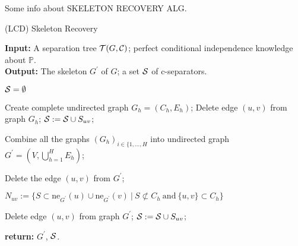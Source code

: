 %
%


Some info about SKELETON RECOVERY ALG.

\begin{algorithm}
	\caption{(LCD) Skeleton Recovery}\label{skeletonRecoveryAlg}
	
	\textbf{Input:} A separation tree $ \mathcal{T}(G, \mathcal{C})$; 
					perfect conditional independence knowledge about $\mathbb{P}$.  \\
	\textbf{Output:} The skeleton $G^{'}$ of $G$; a set $\mathcal{S}$ of c-separators.

	
	\begin{algorithmic}[1]
			\State $\mathcal{S} = \emptyset$
	
				\State	Create complete undirected graph $G_h = (C_h, E_h)$;
						\State Delete edge $(u, v)$ from graph $G_h$;
						\State $\mathcal{S} := \mathcal{S} \cup S_{uv}$; 
					\EndIf
				\EndFor
			\EndFor			
		
			\State Combine all the graphs $(G_h)_{i \in \{1, \dots, H}$ into undirected graph 
			$G^{'} = (V, \bigcup_{h = 1}^{H} E_h)$;
			
					\State Delete the edge $(u, v)$ from $G^{'}$;
				\EndIf
			\EndFor
			
					
				\State $N_{uv} := \{S \subset \mbox{ne}_{G^{'}}(u) \cup \mbox{ne}_{G^{'}}(v) \ | \ 
									S \not\subset C_h \ \mbox{and} \ \{u, v\} \subset C_h  \}$
									
					\State Delete edge $(u, v)$ from graph $G^{'}$;
					\State $\mathcal{S} := \mathcal{S} \cup S_{uv}$; 
				\EndIf
			\EndFor	
			
			\State \textbf{return:} $G^{'}$, $\mathcal{S}$.
		\EndProcedure
	\end{algorithmic}
\end{algorithm}


